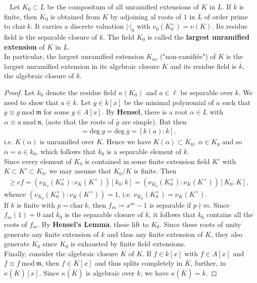 \documentclass[12pt,a4paper,footinclude=true,headinclude=true]{scrbook} %
\newenvironment{corollary}[2][]
{\renewcommand\theinnercustomcol{#2}\innercustomcol[#1]
\begin{mdframed}[backgroundcolor=gray!20]\ }
{\end{mdframed}\endinnercustomcol}
\begin{document}
\begin{corollary}{277. (Largest Unramified Extension)}
    \newline Let $K_0\subset L$ be the compositum of all unramified extensions of $K$ in $L$. If $k$ is finite, then $K_0$ is obtained from $K$ by adjoining al roots of $1$ in $L$ of order prime to $\mathrm{char}\ k$. It carries a discrete valuation $|\cdot|_0$ with $\nu_0(K_0^\times)=\nu(K)$. Its residue field is the separable closure of $k$. The field $K_0$ is called the \textbf{largest unramified extension} of $K$ in $L$. \\ In particular, the largest unramified extension $K_{nr}$ ("non-ramifi\'{e}e") of $K$ is the largest unramified extension in its algebraic closure $\overline{K}$ and its residue field is $\overline{k}$, the algebraic closure of $k$.
\end{corollary}
\begin{proof}
    Let $k_0$ denote the residue field $\kappa(K_0)$ and $a\in\ell$ be separable over $k$. We need to show that $a\in k$. Let $\overline{g}\in k[x]$ be the minimal polynomial of $a$ such that $\overline{g}\equiv g\ \mathrm{mod}\ \mathfrak{m}$ for some $g\in A[x]$. By \textbf{Hensel}, there is a root $\alpha\in L$ with $\alpha\equiv a\ \mathrm{mod}\ \mathfrak{n}$, (note that the roots of $\overline{g}$ are simple). But then 
    \begin{align*}
        [K(\alpha):K]=\mathrm{deg}\ g=\mathrm{deg}\ \overline{g}=[k(a):k],
    \end{align*}
    i.e. $K(\alpha)$ is unramified over $K$. Hence we have $K(\alpha)\subset K_0,\ \alpha\in K_0$ and so $\overline{\alpha}=a\in k_0$, which follows that $k_0$ is a separable element of $k$. \\ Since every element of $K_0$ is contained in some finite extension field $K'$ with $K\subset K'\subset K_0$, we may assume that $K_0/K$ is finite. Then
    \begin{align*}
        [K_0:K]\geq ef=(\nu_{K_0}(K_0^\times):\nu_K(K^\times))[k_0:k]
        =(\nu_{K_0}(K_0^\times):\nu_K(K^\times))[K_0:K],
    \end{align*}
    whence $(\nu_{K_0}(K_0^\times):\nu_K(K^\times))=1$, i.e. $\nu_{K_0}(K_0^\times)=\nu_K(K^\times)$.\\
    If $k$ is finite with $p=\mathrm{char}\ k$, then $f_m\coloneqq x^m-1$ is separable if $p\nmid m$. Since $f_m(1)=0$ and $k_0$ is the separable closure of $k$, it follows that $k_0$ contains all the roots of $f_m$. By \textbf{Hensel's Lemma}, these lift to $K_0$. Since these roots of unity generate any finite extension of $k$ and thus any finite extension of $K$, they also generate $K_0$ since $K_0$ is exhausted by finite field extensions.\\ Finally, consider the algebraic closure $\overline{K}$ of $K$. If $\overline{f}\in k[x]$ with $f\in A[x]$ and $\overline{f}\equiv f\ \mathrm{mod}\ \mathfrak{m}$, then $f\in\overline{K}[x]$ and thus splits completely in $\overline{K}$, further, in $\kappa(\overline{K})[x]$. Since $\kappa(\overline{K})$ is algebraic over $k$, we have $\kappa(\overline{K})=k$.
\end{proof}
\newpage
\end{document}
